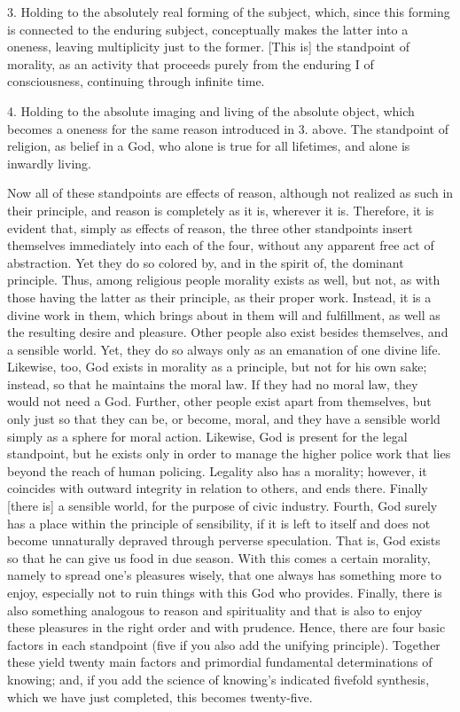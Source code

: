3. Holding to the absolutely
real forming of the subject,
which, since this forming is
connected to the enduring subject,
conceptually makes the latter into a oneness,
leaving multiplicity just to the former.
[This is] the standpoint of morality,
as an activity that proceeds purely
from the enduring I of consciousness,
continuing through infinite time.

4. Holding to the absolute
imaging and living of the absolute object,
which becomes a oneness
for the same reason introduced in 3. above.
The standpoint of religion,
as belief in a God,
who alone is true for all lifetimes,
and alone is inwardly living.

Now all of these standpoints are effects of reason,
although not realized as such in their principle,
and reason is completely as it is, wherever it is.
Therefore, it is evident that, simply as effects of reason,
the three other standpoints insert themselves
immediately into each of the four,
without any apparent free act of abstraction.
Yet they do so colored by,
and in the spirit of,
the dominant principle.
Thus, among religious people morality exists as well,
but not, as with those having the latter as their principle,
as their proper work.
Instead, it is a divine work in them,
which brings about in them will and fulfillment,
as well as the resulting desire and pleasure.
Other people also exist besides themselves, and a sensible world.
Yet, they do so always only as an emanation of one divine life.
Likewise, too, God exists in morality as a principle,
but not for his own sake;
instead, so that he maintains the moral law.
If they had no moral law, they would not need a God.
Further, other people exist apart from themselves,
but only just so that they can be, or become, moral,
and they have a sensible world simply as a sphere for moral action.
Likewise, God is present for the legal standpoint,
but he exists only in order to manage the
higher police work that lies beyond the reach of human policing.
Legality also has a morality;
however, it coincides with outward integrity in relation to others, and ends there.
Finally [there is] a sensible world,
for the purpose of civic industry.
Fourth, God surely has a place within the principle of sensibility,
if it is left to itself and does not become
unnaturally depraved through perverse speculation.
That is, God exists so that he can give us food in due season.
With this comes a certain morality,
namely to spread one’s pleasures wisely,
that one always has something more to enjoy,
especially not to ruin things
with this God who provides.
Finally, there is also something analogous
to reason and spirituality
and that is also to enjoy these pleasures
in the right order and with prudence.
Hence, there are four basic factors in each standpoint
(five if you also add the unifying principle).
Together these yield twenty main factors
and primordial fundamental determinations of knowing;
and, if you add the science of knowing’s
indicated fivefold synthesis,
which we have just completed,
this becomes twenty-five.

